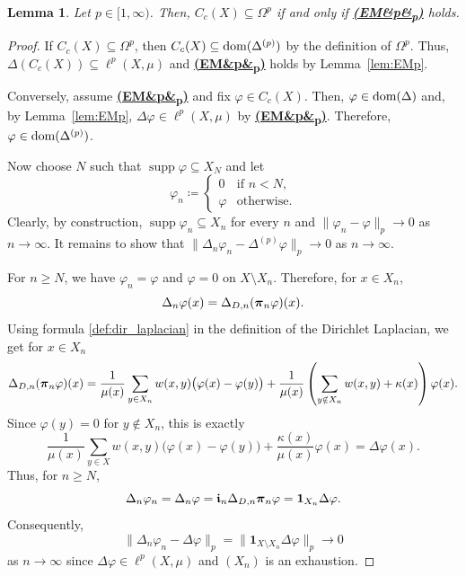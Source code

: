 \documentclass[letterpaper]{article}
\newtheorem{lemma}{Lemma}[section]
\theoremstyle{definition}
\theoremstyle{named}
\numberwithin{equation}{section}
\newcommand{\EM}[1][]{\hyperlink{ass:EM}{\textup{\textbf{(EM\ifx&#1&\else\textsubscript{#1}\fi)}}}}
\newcommand{\dom}{\textnormal{dom}} %
\newcommand{\Dep}{\Delta^{(p)}}
\newcommand{\Deltadir}[1][]{\Delta_{D\ifx&#1&\else,#1\fi}}
\begin{document}
\begin{lemma}\label{lem:Cc_density_Omegap}
Let $p\in [1,\infty)$.  Then, $C_c(X) \subseteq \Omega^p$ if and only if \EM[p] holds.
\end{lemma}
\begin{proof}
If $C_c(X) \subseteq \Omega^p$, then $C_c(X) \subseteq \dom(\Dep)$ by the definition of $\Omega^p$. Thus, $\Delta(C_c(X)) \subseteq \ell^p(X,\mu)$ and  \EM[p] holds by Lemma~\ref{lem:EMp}.


Conversely, assume \EM[p] and fix $\varphi\in C_c(X)$. Then, $\varphi \in \dom(\Delta)$ and,  
by Lemma~\ref{lem:EMp}, $\Delta \varphi \in \ell^p(X,\mu)$
by \EM[p]. Therefore, $\varphi \in\dom(\Delta^{(p)})$.

Now choose $N$ such that $\operatorname{supp} \varphi \subseteq X_N$ and let 
$$
\varphi_n \coloneqq \begin{cases}
    0 &\mbox{if } n < N,\\
    \varphi &\mbox{otherwise}.
\end{cases}
$$
Clearly, by construction, $\operatorname{supp} \varphi_n \subseteq X_n$ for every $n$ and $\|\varphi_n - \varphi\|_p\to 0$ as $n\to\infty$. It remains to show that $\|\Delta_n\varphi_n - \Delta^{(p)} \varphi \|_p\to 0$
as $n \to \infty$.

For $n \geq N$, we have $\varphi_n=\varphi$ and $\varphi=0$ on $X\setminus X_n$. Therefore, for $x\in X_n$,
$$
\Delta_n \varphi(x) = \Deltadir[n](\boldsymbol{\pi}_n \varphi)(x).
$$
Using formula \eqref{def:dir_laplacian} in the definition of the Dirichlet Laplacian, we get
for $x \in X_n$
$$
\Deltadir[n](\boldsymbol{\pi}_n \varphi)(x) = \frac{1}{\mu(x)} \sum_{y\in X_n} w(x,y)\bigl(\varphi(x)-\varphi(y)\bigr) + \frac{1}{\mu(x)} \left( \sum_{y\notin X_n} w(x,y)+\kappa(x) \right)\varphi(x).
$$
Since $\varphi(y)=0$ for $y\notin X_n$, this is exactly
$$
\frac{1}{\mu(x)} \sum_{y\in X} w(x,y)\bigl(\varphi(x)-\varphi(y)\bigr) + \frac{\kappa(x)}{\mu(x)}\varphi(x) = \Delta \varphi(x).
$$
Thus, for $n \geq N$,
$$
\Delta_n\varphi_n=\Delta_n \varphi= \boldsymbol{\mathfrak{i}}_{n}\Deltadir[n]\boldsymbol{\pi}_{n} \varphi = \mathbf{1}_{X_n}\Delta \varphi.
$$
Consequently,
$$\|\Delta_n\varphi_n-\Delta \varphi\|_p = \|\mathbf{1}_{X\setminus X_n}\Delta \varphi\|_p\to 0 
$$
as $n \to \infty$ since $\Delta \varphi\in \ell^p(X,\mu)$ and $(X_n)$ is an exhaustion.
\end{proof}
\end{document}
